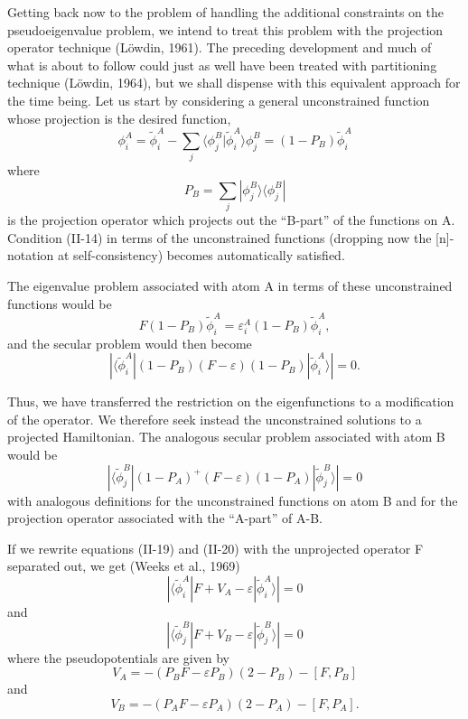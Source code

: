\documentclass[12pt,letterpaper]{report}
\begin{document}
Getting back now to the problem of handling the additional constraints on the pseudoeigenvalue problem, we intend to treat this problem with the projection operator technique (Löwdin, 1961). The preceding development and much of what is about to follow could just as well have been treated with partitioning technique (Löwdin, 1964), but we shall dispense with this equivalent approach for the time being. Let us start by considering a general unconstrained function whose projection is the desired function,
\begin{equation}
\phi_i^A = \tilde{\phi}_i^A - \sum_j \langle \phi_j^B | \tilde{\phi}_i^A \rangle \phi_j^B = (1 - P_B) \tilde{\phi}_i^A
\end{equation}
where
\begin{equation}
P_B = \sum_j |\phi_j^B \rangle \langle \phi_j^B|
\end{equation}
is the projection operator which projects out the ``B-part'' of the functions on A. Condition (II-14) in terms of the unconstrained functions (dropping now the [n]-notation at self-consistency) becomes automatically satisfied.

The eigenvalue problem associated with atom A in terms of these unconstrained functions would be
\begin{equation}
F(1 - P_B) \tilde{\phi}_i^A = \varepsilon_i^A (1 - P_B) \tilde{\phi}_i^A,
\end{equation}
and the secular problem would then become
\begin{equation}
|\langle \tilde{\phi}_i^A | (1 - P_B)(F - \varepsilon)(1 - P_B) | \tilde{\phi}_i^A \rangle| = 0.
\end{equation}

Thus, we have transferred the restriction on the eigenfunctions to a modification of the operator. We therefore seek instead the unconstrained solutions to a projected Hamiltonian. The analogous secular problem associated with atom B would be
\begin{equation}
|\langle \tilde{\phi}_j^B | (1 - P_A)^+ (F - \varepsilon)(1 - P_A) | \tilde{\phi}_j^B \rangle| = 0
\end{equation}
with analogous definitions for the unconstrained functions on atom B and for the projection operator associated with the ``A-part'' of A-B.

If we rewrite equations (II-19) and (II-20) with the unprojected operator F separated out, we get (Weeks et al., 1969)
\begin{equation}
|\langle \tilde{\phi}_i^A | F + V_A - \varepsilon | \tilde{\phi}_i^A \rangle| = 0
\end{equation}
and
\begin{equation}
|\langle \tilde{\phi}_j^B | F + V_B - \varepsilon | \tilde{\phi}_j^B \rangle| = 0
\end{equation}
where the pseudopotentials are given by
\begin{equation}
V_A = -(P_B F - \varepsilon P_B)(2 - P_B) - [F, P_B]
\end{equation}
and
\begin{equation}
V_B = -(P_A F - \varepsilon P_A)(2 - P_A) - [F, P_A].
\end{equation}
\end{document}
